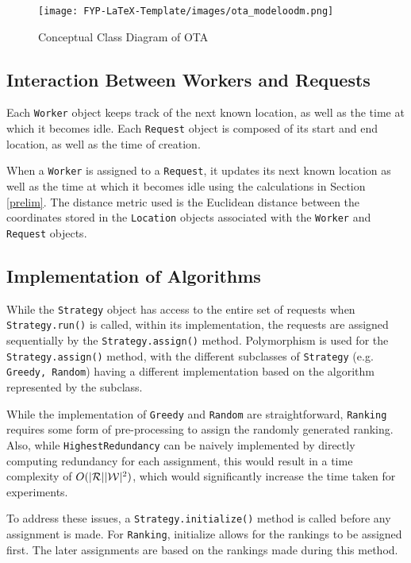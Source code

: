 \documentclass[urop]{socreport}
\begin{document}
\begin{figure}[h]
    \centering
    \texttt{[image: FYP-LaTeX-Template/images/ota\_modeloodm.png]}
    \caption{Conceptual Class Diagram of OTA}
    \label{fig:model}
\end{figure}

\subsection{Interaction Between Workers and Requests}
Each \verb|Worker| object keeps track of the next known location, as well as the time at which it becomes idle. Each \verb|Request| object is composed of its start and end location, as well as the time of creation. 

When a \verb|Worker| is assigned to a \verb|Request|, it updates its next known location as well as the time at which it becomes idle using the calculations in Section \ref{prelim}. The distance metric used is the Euclidean distance between the coordinates stored in the \verb|Location| objects associated with the \verb|Worker| and \verb|Request| objects.

\subsection{Implementation of Algorithms}
While the \verb|Strategy| object has access to the entire set of requests when \verb|Strategy.run()| is called, within its implementation, the requests are assigned sequentially by the \verb|Strategy.assign()| method. Polymorphism is used for the \verb|Strategy.assign()| method, with the different subclasses of \verb|Strategy| (e.g. \verb|Greedy, Random|) having a different implementation based on the algorithm represented by the subclass.

While the implementation of \verb|Greedy| and \verb|Random| are straightforward, \verb|Ranking| requires some form of pre-processing to assign the randomly generated ranking. Also, while \verb|HighestRedundancy| can be naively implemented by directly computing redundancy for each assignment, this would result in a time complexity of $O(|\mathcal{R}||\mathcal{W}|^2)$, which would significantly increase the time taken for experiments.

To address these issues, a \verb|Strategy.initialize()| method is called before any assignment is made. For \verb|Ranking|, initialize allows for the rankings to be assigned first. The later assignments are based on the rankings made during this method.
\end{document}
